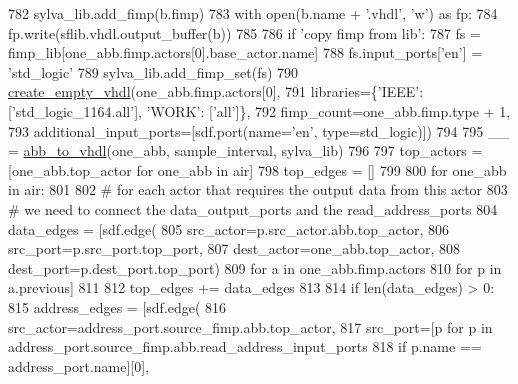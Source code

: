 \begin{DoxyCode}
782                         sylva\_lib.add\_fimp(b.fimp)
783                         with open(b.name + \textcolor{stringliteral}{'.vhdl'}, \textcolor{stringliteral}{'w'}) \textcolor{keyword}{as} fp:
784                             fp.write(sflib.vhdl.output\_buffer(b))
785 
786             \textcolor{keywordflow}{if} \textcolor{stringliteral}{'copy fimp from lib'}:
787                 fs = fimp\_lib[one\_abb.fimp.actors[0].base\_actor.name]
788                 fs.input\_ports[\textcolor{stringliteral}{'en'}] = \textcolor{stringliteral}{'std\_logic'}
789                 sylva\_lib.add\_fimp\_set(fs)
790                 \hyperlink{namespacesylva_1_1code__generation_1_1hsdf__to__vhdl_a34788575516a0c7731b0e5abd4d42231}{create\_empty\_vhdl}(one\_abb.fimp.actors[0],
791                                   libraries=\{\textcolor{stringliteral}{'IEEE'}: [\textcolor{stringliteral}{'std\_logic\_1164.all'}], \textcolor{stringliteral}{'WORK'}: [\textcolor{stringliteral}{'all'}]\},
792                                   fimp\_count=one\_abb.fimp.type + 1,
793                                   additional\_input\_ports=[sdf.port(name=\textcolor{stringliteral}{'en'}, type=std\_logic)])
794 
795         \_\_ = \hyperlink{namespacesylva_1_1code__generation_1_1air_a353257c84de380833218457a45c3f2a3}{abb\_to\_vhdl}(one\_abb, sample\_interval, sylva\_lib)
796 
797     top\_actors = [one\_abb.top\_actor \textcolor{keywordflow}{for} one\_abb \textcolor{keywordflow}{in} air]
798     top\_edges = []
799 
800     \textcolor{keywordflow}{for} one\_abb \textcolor{keywordflow}{in} air:
801 
802         \textcolor{comment}{# for each actor that requires the output data from this actor}
803         \textcolor{comment}{# we need to connect the data\_output\_ports and the read\_address\_ports}
804         data\_edges = [sdf.edge(
805             src\_actor=p.src\_actor.abb.top\_actor,
806             src\_port=p.src\_port.top\_port,
807             dest\_actor=one\_abb.top\_actor,
808             dest\_port=p.dest\_port.top\_port)
809             \textcolor{keywordflow}{for} a \textcolor{keywordflow}{in} one\_abb.fimp.actors
810             \textcolor{keywordflow}{for} p \textcolor{keywordflow}{in} a.previous]
811 
812         top\_edges += data\_edges
813 
814         \textcolor{keywordflow}{if} len(data\_edges) > 0:
815             address\_edges = [sdf.edge(
816                 src\_actor=address\_port.source\_fimp.abb.top\_actor,
817                 src\_port=[p \textcolor{keywordflow}{for} p \textcolor{keywordflow}{in} address\_port.source\_fimp.abb.read\_address\_input\_ports
818                           \textcolor{keywordflow}{if} p.name == address\_port.name][0],

\end{DoxyCode}
